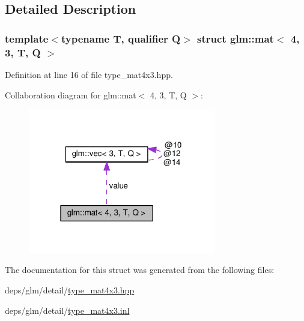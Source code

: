 \subsection{Detailed Description}
\subsubsection*{template$<$typename T, qualifier Q$>$\newline
struct glm\+::mat$<$ 4, 3, T, Q $>$}



Definition at line 16 of file type\+\_\+mat4x3.\+hpp.



Collaboration diagram for glm\+:\+:mat$<$ 4, 3, T, Q $>$\+:
\nopagebreak
\begin{figure}[H]
\begin{center}
\leavevmode
\includegraphics[width=232pt]{d4/d06/structglm_1_1mat_3_014_00_013_00_01T_00_01Q_01_4__coll__graph}
\end{center}
\end{figure}


The documentation for this struct was generated from the following files\+:\begin{DoxyCompactItemize}
\item 
deps/glm/detail/\hyperlink{type__mat4x3_8hpp}{type\+\_\+mat4x3.\+hpp}\item 
deps/glm/detail/\hyperlink{type__mat4x3_8inl}{type\+\_\+mat4x3.\+inl}\end{DoxyCompactItemize}
